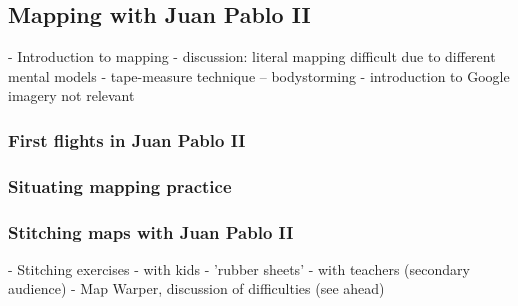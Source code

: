 \documentclass[11pt]{report}
\begin{document}
\subsection{Mapping with Juan Pablo II}

                - Introduction to mapping
                    - discussion: literal mapping difficult due to different mental models
                    - tape-measure technique -- bodystorming
                    - introduction to Google imagery not relevant
\subsubsection{First flights in Juan Pablo II}


\subsubsection{Situating mapping practice}


\subsubsection{Stitching maps with Juan Pablo II}
                - Stitching exercises
                    - with kids - 'rubber sheets'
                        - with teachers (secondary audience) - Map Warper, discussion of difficulties (see ahead)
\end{document}
